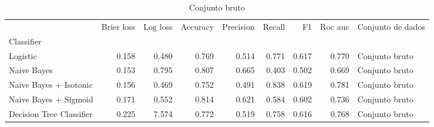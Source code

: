 \begin{table}
\centering
\caption{Conjunto bruto}
\label{Conjunto bruto 0}
\begin{tabular}{lrrrrrrrl}
\toprule
{} &  Brier  loss &  Log loss &  Accuracy  &  Precision  &  Recall  &    F1  &  Roc auc  & Conjunto de dados \\
Classifier               &              &           &            &             &          &        &           &                   \\
\midrule
Logistic                 &        0.158 &     0.480 &      0.769 &       0.514 &    0.771 &  0.617 &     0.770 &    Conjunto bruto \\
Naive Bayes              &        0.153 &     0.795 &      0.807 &       0.665 &    0.403 &  0.502 &     0.669 &    Conjunto bruto \\
Naive Bayes + Isotonic   &        0.156 &     0.469 &      0.752 &       0.491 &    0.838 &  0.619 &     0.781 &    Conjunto bruto \\
Naive Bayes + Sigmoid    &        0.171 &     0.552 &      0.814 &       0.621 &    0.584 &  0.602 &     0.736 &    Conjunto bruto \\
Decision Tree Classifier &        0.225 &     7.574 &      0.772 &       0.519 &    0.758 &  0.616 &     0.768 &    Conjunto bruto \\
\bottomrule
\end{tabular}
\end{table}
